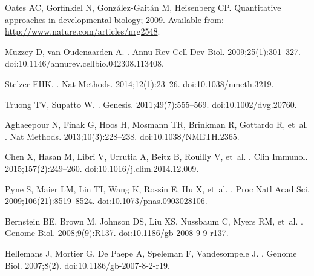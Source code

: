 \documentclass[10pt,letterpaper]{article}
\begin{document}
\begin{thebibliography}{10}

Oates AC, Gorfinkiel N, Gonz{\'{a}}lez-Gait{\'{a}}n M, Heisenberg CP.
  {Quantitative approaches in developmental biology}; 2009.
\newblock Available from: \url{http://www.nature.com/articles/nrg2548}.

Muzzey D, van Oudenaarden A.
.
\newblock Annu Rev Cell Dev Biol. 2009;25(1):301--327.
\newblock doi:{10.1146/annurev.cellbio.042308.113408}.

Stelzer EHK.
.
\newblock Nat Methods. 2014;12(1):23--26.
\newblock doi:{10.1038/nmeth.3219}.

Truong TV, Supatto W.
.
\newblock Genesis. 2011;49(7):555--569.
\newblock doi:{10.1002/dvg.20760}.

Aghaeepour N, Finak G, Hoos H, Mosmann TR, Brinkman R, Gottardo R, et~al.
.
\newblock Nat Methods. 2013;10(3):228--238.
\newblock doi:{10.1038/NMETH.2365}.

Chen X, Hasan M, Libri V, Urrutia A, Beitz B, Rouilly V, et~al.
.
\newblock Clin Immunol. 2015;157(2):249--260.
\newblock doi:{10.1016/j.clim.2014.12.009}.

Pyne S, Maier LM, Lin TI, Wang K, Rossin E, Hu X, et~al.
.
\newblock Proc Natl Acad Sci. 2009;106(21):8519--8524.
\newblock doi:{10.1073/pnas.0903028106}.

Bernstein BE, Brown M, Johnson DS, Liu XS, Nussbaum C, Myers RM, et~al.
.
\newblock Genome Biol. 2008;9(9):R137.
\newblock doi:{10.1186/gb-2008-9-9-r137}.

Hellemans J, Mortier G, {De Paepe} A, Speleman F, Vandesompele J.
.
\newblock Genome Biol. 2007;8(2).
\newblock doi:{10.1186/gb-2007-8-2-r19}.


\end{thebibliography}
\end{document}
